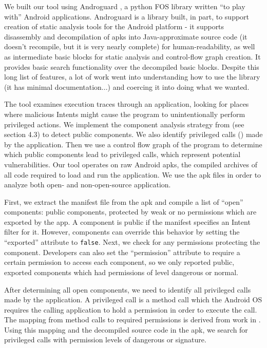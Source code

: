 \documentclass[12pt,a4paper]{article}
\begin{document}
We built our tool using Androguard \cite{androguard}, a
python FOS library written ``to play with'' Android applications. Androguard is
a library built, in part, to support creation of static analysis tools for the
Android platform - it supports disassembly and decompilation of apks into
Java-approximate source code (it doesn't recompile, but it is very nearly
complete) for human-readability, as well as intermediate basic blocks for static
analysis and control-flow graph creation. It provides basic search functionality
over the decompiled basic blocks. Despite this long list of features, a lot of
work went into understanding how to use the library (it has minimal
documentation...) and coercing it into doing what we wanted.

The tool examines execution traces through an application, looking for places
where malicious Intents might cause the program to unintentionally perform
privileged actions. We implement the component analysis strategy from
\cite{chin_analyzing_2011} (see section 4.3) to detect public components. We
also identify privileged calls (\cite{felt_android_2011}) made by the
application. Then we use a control flow graph of the program to determine which
public components lead to privileged calls, which represent potential
vulnerabilities. Our tool operates on raw Android apks, the compiled archives of
all code required to load and run the application. We use the apk files in order
to analyze both open- and non-open-source application.

First, we extract the manifest file from the apk and compile a list of ``open''
components: public components, protected by weak or no permissions which are
exported by the app. A component is public if the manifest specifies an Intent
filter for it. However, components can override this behavior by setting the
``exported'' attribute to \texttt{false}. Next, we check for any permissions
protecting the component. Developers can also set the ``permission'' attribute
to require a certain permission to access each component, so we only reported
public, exported components which had permissions of level dangerous or normal.

After determining all open components, we need to identify all privileged calls
made by the application. A privileged call is a method call which the Android OS
requires the calling application to hold a permission in order to execute
the call. The mapping from method calls to required permissions is
derived from work in \cite{felt_android_2011}. Using this mapping and the
decompiled source code in the apk, we search for privileged calls with
permission levels of dangerous or signature.
\end{document}
